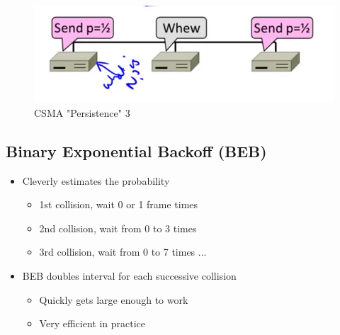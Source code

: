 \documentclass[12pt]{ctexart}   %
\begin{document}
\begin{itemize}
		 \begin{figure}[h!] %
		\centering
		 \includegraphics[scale=0.7]{images/3-4-9}
		\caption{ CSMA "Persistence" 3 }
		 \label{fig:3-4-9}
		 \end{figure}
	\end{itemize}
	
	\subsection{ Binary Exponential Backoff (BEB) }
	\begin{itemize}
		\item Cleverly estimates the probability
		\begin{itemize}
			\item 1st collision, wait 0 or 1 frame times
			\item 2nd collision, wait from 0 to 3 times
			\item 3rd collision, wait from 0 to 7 times ...
		\end{itemize}
		
		\item BEB doubles interval for each successive collision
		\begin{itemize}
			\item Quickly gets large enough to work
			\item Very efficient in practice
		\end{itemize}
	\end{itemize}
	
\end{document}
